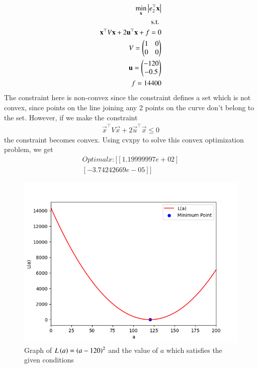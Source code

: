 \documentclass[journal]{IEEEtran}
\begin{document}
\begin{align}
    \min_{\mathbf{x}} \left\vert e_2^{\top}\mathbf{x}\right\vert\\
    \text{s.t. } \\ \mathbf{x}^{\top}V\mathbf{x} + 2\mathbf{u}^{\top}\mathbf{x} + f = 0\\
    V = \begin{pmatrix}1 & 0 \\ 0 & 0\end{pmatrix}\\
    \mathbf{u} = \begin{pmatrix}-120 \\ -0.5\end{pmatrix}\\
    f = 14400
\end{align}
The constraint here is non-convex since the constraint defines a set which is not convex, since points on the
line joining any 2 points on the curve don't belong to the set. However, if we make the constraint
\begin{align}
    \vec{x}^{\top}V\vec{x} + 2\vec{u}^{\top}\vec{x} \le 0
\end{align}
the constraint becomes convex. Using cvxpy to solve this convex optimization problem, we get \\
\begin{align}
    Optimal x: [[ 1.19999997e+02]\\
 [-3.74242669e-05]]
\end{align}
\begin{figure}[h!]
   \centering
   \includegraphics[width=\columnwidth]{figs/fig1.png}
   \caption{Graph of $L\left(a\right) = \left(a - 120\right)^2$ and the value of $a$ which satisfies the given conditions}
   \label{stemplot}
\end{figure}
\end{document}
